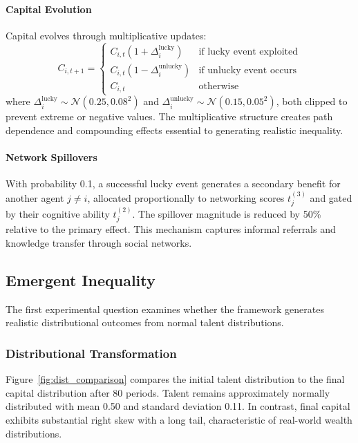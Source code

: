 \paragraph{Capital Evolution}
Capital evolves through multiplicative updates:
\begin{equation}
  C_{i,t+1}=
  \begin{cases}
    C_{i,t}(1 + \Delta_{i}^{\text{lucky}})   & \text{if lucky event exploited} \\
    C_{i,t}(1 - \Delta_{i}^{\text{unlucky}}) & \text{if unlucky event occurs}  \\
    C_{i,t}                                  & \text{otherwise}
  \end{cases}
\end{equation}
where $\Delta_{i}^{\text{lucky}}\sim \mathcal{N}(0.25, 0.08^{2})$ and $\Delta
_{i}^{\text{unlucky}}\sim \mathcal{N}(0.15, 0.05^{2})$, both clipped to
prevent extreme or negative values. The multiplicative structure creates
path dependence and compounding effects essential to generating realistic
inequality.

\paragraph{Network Spillovers}
With probability 0.1, a successful lucky event generates a secondary benefit
for another agent $j \neq i$, allocated proportionally to networking
scores $t_{j}^{(3)}$ and gated by their cognitive ability $t_{j}^{(2)}$.
The spillover magnitude is reduced by 50\% relative to the primary
effect. This mechanism captures informal referrals and knowledge transfer
through social networks.

\subsection{Emergent Inequality}

The first experimental question examines whether the framework generates
realistic distributional outcomes from normal talent distributions.

\subsubsection{Distributional Transformation}

Figure~\ref{fig:dist_comparison} compares the initial talent distribution
to the final capital distribution after 80 periods. Talent remains
approximately normally distributed with mean 0.50 and standard deviation
0.11. In contrast, final capital exhibits substantial right skew with a
long tail, characteristic of real-world wealth distributions.

